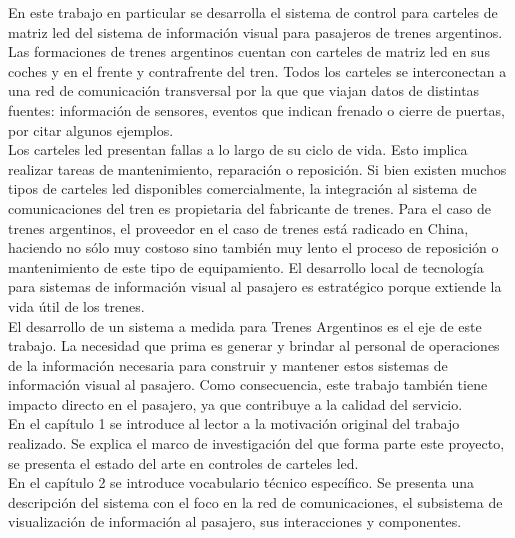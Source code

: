 En este trabajo en particular se desarrolla el sistema de control para carteles de matriz led del sistema de información visual para pasajeros de trenes argentinos. Las formaciones de trenes argentinos cuentan con carteles de matriz led en sus coches y en el frente y contrafrente del tren. Todos los carteles se interconectan a una red de comunicación transversal por la que que viajan datos de distintas fuentes: información de sensores, eventos que indican frenado o cierre de puertas, por citar algunos ejemplos. \\

Los carteles led presentan fallas a lo largo de su ciclo de vida. Esto implica realizar tareas de mantenimiento, reparación o reposición. Si bien existen muchos tipos de carteles led disponibles comercialmente, la integración al sistema de comunicaciones del tren es propietaria del fabricante de trenes. Para el caso de trenes argentinos, el proveedor en el caso de trenes está radicado en China, haciendo no sólo muy costoso sino también muy lento el proceso de reposición o mantenimiento de este tipo de equipamiento. El desarrollo local de tecnología para sistemas de información visual al pasajero es estratégico porque extiende la vida útil de los trenes.\\


El desarrollo de un sistema a medida para Trenes Argentinos es el eje de este trabajo. La necesidad que prima es generar y brindar al personal de operaciones de la información necesaria para construir y mantener estos sistemas de información visual al pasajero. Como consecuencia, este trabajo también tiene impacto directo en el pasajero, ya que contribuye a la calidad del servicio.\\


En el capítulo 1 se introduce al lector a la motivación original del trabajo realizado. Se explica el marco de investigación del que forma parte este proyecto, se presenta el estado del arte en controles de carteles led.\\

En el capítulo 2 se introduce vocabulario técnico específico. Se presenta una descripción del sistema con el foco en la red de comunicaciones, el subsistema de visualización de información al pasajero, sus interacciones y componentes.\\

